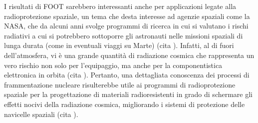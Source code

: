 \documentclass[12pt,a4paper,twoside]{report}
\begin{document}
	I risultati di FOOT sarebbero interessanti anche per applicazioni legate alla radioprotezione spaziale, un tema che desta interesse ad agenzie spaziali come la NASA, che da alcuni anni svolge programmi di ricerca in cui si valutano i rischi radiativi a cui si potrebbero sottoporre gli astronauti nelle missioni spaziali di lunga durata (come in eventuali viaggi su Marte) (cita
	). Infatti, al di fuori dell'atmosfera, vi è una grande quantità di radiazione cosmica che rappresenta un vero rischio non solo per l'equipaggio, ma anche per la componentistica elettronica in orbita (cita
	). Pertanto, una dettagliata conoscenza dei processi di frammentazione nucleare risulterebbe utile ai programmi di radioprotezione spaziale per la progettazione di materiali radioresistenti in grado di schermare gli effetti nocivi della radiazione cosmica, migliorando i sistemi di protezione delle navicelle spaziali (cita
	).
	
\end{document}
